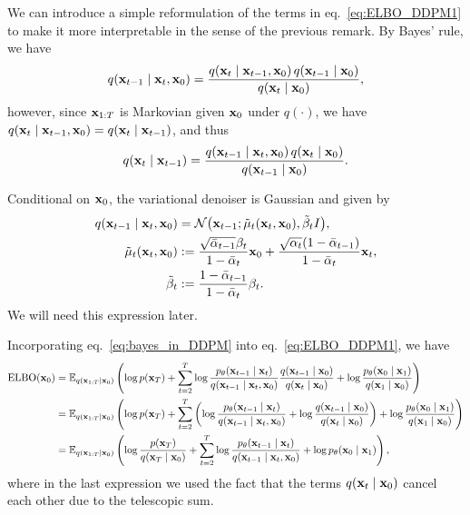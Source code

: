We can introduce a simple reformulation of the terms in eq.~\eqref{eq:ELBO_DDPM1} to make it more interpretable in the sense of the previous remark. By Bayes' rule, we have
\[
q({ \mathbf{x}}_{t-1}\mid { \mathbf{x}}_t,{ \mathbf{x}}_0)
=
\frac{q({ \mathbf{x}}_t\mid { \mathbf{x}}_{t-1},{ \mathbf{x}}_0)\,q({ \mathbf{x}}_{t-1}\mid { \mathbf{x}}_0)}{q({ \mathbf{x}}_t\mid { \mathbf{x}}_0)},
\]
however, since ${ \mathbf{x}}_{1:T}$ is Markovian given ${ \mathbf{x}}_0$ under $q(\cdot)$, we have $q({ \mathbf{x}}_t\mid { \mathbf{x}}_{t-1},{ \mathbf{x}}_0)=q({ \mathbf{x}}_t\mid { \mathbf{x}}_{t-1})$, and thus
\begin{equation}
    q({ \mathbf{x}}_t\mid { \mathbf{x}}_{t-1})
=
\frac{q({ \mathbf{x}}_{t-1}\mid { \mathbf{x}}_t,{ \mathbf{x}}_0)\,q({ \mathbf{x}}_t\mid { \mathbf{x}}_0)}{q({ \mathbf{x}}_{t-1}\mid { \mathbf{x}}_0)}.
\label{eq:bayes_in_DDPM}
\end{equation}

\begin{remark}
    Conditional on ${ \mathbf{x}}_0$, the variational denoiser is Gaussian and given by 
    \begin{align}
q({ \mathbf{x}}_{t-1}\mid { \mathbf{x}}_t, { \mathbf{x}}_0)
&=
\mathcal{N}\bigl({ \mathbf{x}}_{t-1}; \tilde{\mu}_t({ \mathbf{x}}_t,{ \mathbf{x}}_0), \tilde{\beta}_t I \bigr), \label{eq:conditional_denoiser} \\
\tilde{\mu}_t({ \mathbf{x}}_t,{ \mathbf{x}}_0)
&:=
\frac{\sqrt{\bar{\alpha}_{t-1}}\beta_t}{1-\bar{\alpha}_t}{ \mathbf{x}}_0
+
\frac{\sqrt{\alpha_t}(1-\bar{\alpha}_{t-1})}{1-\bar{\alpha}_t}{ \mathbf{x}}_t, \label{eq:conditional_denoiser_mean}\\
\tilde{\beta}_t
&:=
\frac{1-\bar{\alpha}_{t-1}}{1-\bar{\alpha}_t}\beta_t. \label{eq:conditional_denoiser_var}
\end{align}
We will need this expression later. 
\end{remark}

Incorporating eq.~\eqref{eq:bayes_in_DDPM} into eq.~\eqref{eq:ELBO_DDPM1}, we have 
\begin{align}
    {\text{ELBO}}({ \mathbf{x}}_0)
     &= \mathbb{E}_{q({ \mathbf{x}}_{1:T} \mid { \mathbf{x}}_0)} \left(\log p({ \mathbf{x}}_T) + \sum_{t=2}^{T}\log\frac{p_\theta ({ \mathbf{x}}_{t-1} \mid { \mathbf{x}}_t)}{ q({ \mathbf{x}}_{t-1}\mid { \mathbf{x}}_t,{ \mathbf{x}}_0)}\frac{q({ \mathbf{x}}_{t-1}\mid { \mathbf{x}}_0)}{q({ \mathbf{x}}_t\mid { \mathbf{x}}_0)} + \log\frac{p_\theta ({ \mathbf{x}}_{0} \mid { \mathbf{x}}_1)}{ q({ \mathbf{x}}_1 \mid { \mathbf{x}}_{0})} \right)\nonumber\\
     &= \mathbb{E}_{q({ \mathbf{x}}_{1:T} \mid { \mathbf{x}}_0)} \left(\log p({ \mathbf{x}}_T) 
     + \sum_{t=2}^{T}\left(\log\frac{p_\theta ({ \mathbf{x}}_{t-1} \mid { \mathbf{x}}_t)}{ q({ \mathbf{x}}_{t-1}\mid { \mathbf{x}}_t,{ \mathbf{x}}_0)}
     + \log\frac{q({ \mathbf{x}}_{t-1}\mid { \mathbf{x}}_0)}{q({ \mathbf{x}}_t\mid { \mathbf{x}}_0)} \right)
     + \log\frac{p_\theta ({ \mathbf{x}}_{0} \mid { \mathbf{x}}_1)}{ q({ \mathbf{x}}_1 \mid { \mathbf{x}}_{0})} \right)\nonumber\\
     &= \mathbb{E}_{q({ \mathbf{x}}_{1:T} \mid { \mathbf{x}}_0)} \left(
    \log\frac{p({ \mathbf{x}}_T)}{q({ \mathbf{x}}_T\mid { \mathbf{x}}_0)}  
     + \sum_{t=2}^{T}\log\frac{p_\theta ({ \mathbf{x}}_{t-1} \mid { \mathbf{x}}_t)}{ q({ \mathbf{x}}_{t-1}\mid { \mathbf{x}}_t,{ \mathbf{x}}_0)}
     + \log p_\theta ({ \mathbf{x}}_{0} \mid { \mathbf{x}}_1) \label{eq:ELBO_DDPM2}
     \right),
\end{align}
where in the last expression we used the fact that the terms $q({ \mathbf{x}}_t\mid { \mathbf{x}}_0)$ cancel each other due to the telescopic sum. 

